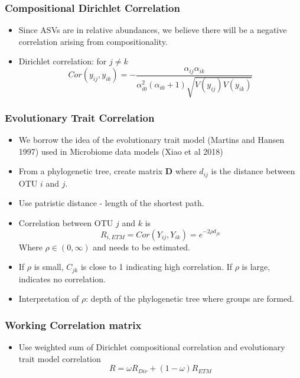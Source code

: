 \documentclass{beamer}
\begin{document}
\begin{frame}
\frametitle{Compositional Dirichlet Correlation}
\begin{itemize}
  \item Since ASVs are in relative abundances, we believe there will be a negative correlation arising from compositionality.
  \item Dirichlet correlation:
  for $j \neq k$
  \[ Cor(y_{ij}, y_{ik})  = - \frac{\alpha_{ij}\alpha_{ik}}{\alpha_{i0}^2(\alpha_{i0} + 1)\sqrt{V(y_{ij})V(y_{ik})}} \]
\end{itemize}
\end{frame}


\begin{frame}
\frametitle{Evolutionary Trait Correlation}
\begin{itemize}
  \item We borrow the idea of the evolutionary trait model (Martins and Hansen 1997) used in Microbiome data models (Xiao et al 2018)
  \item From a phylogenetic tree, create matrix $\mathbf{D}$ where $d_{ij}$ is the distance between OTU $i$ and $j$.
  \item Use patristic distance - length of the shortest path.
  \item Correlation between OTU $j$ and $k$ is
  $$R_{i,ETM} = Cor(Y_{ij}, Y_{ik})  = e^{-2\rho d_{jk}}$$ Where $\rho \in (0,\infty)$ and needs to be estimated.
\item If $\rho$ is small, $C_{jk}$ is close to 1 indicating high correlation. If $\rho$ is large, indicates no correlation.
  \item Interpretation of $\rho$: depth of the phylogenetic tree where groups are formed.
\end{itemize}
\end{frame}


\begin{frame}
\frametitle{Working Correlation matrix}
\begin{itemize}
  \item Use weighted sum of Dirichlet compositional correlation and evolutionary trait model correlation
  \[R = \omega R_{Dir} + (1-\omega)R_{ETM} \]
\end{itemize}
\end{frame}
\end{document}
